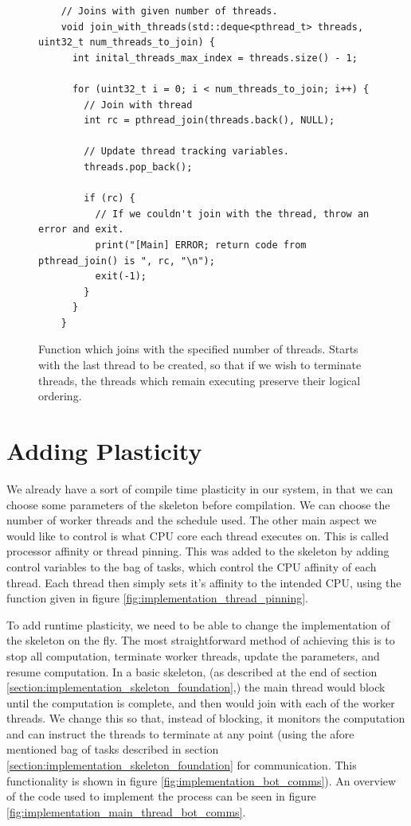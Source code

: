 \begin{figure}
	\begin{lstlisting}
	// Joins with given number of threads. 
	void join_with_threads(std::deque<pthread_t> threads, uint32_t num_threads_to_join) {
	  int inital_threads_max_index = threads.size() - 1;

	  for (uint32_t i = 0; i < num_threads_to_join; i++) {
	    // Join with thread
	    int rc = pthread_join(threads.back(), NULL);

	    // Update thread tracking variables.
	    threads.pop_back();

	    if (rc) {
	      // If we couldn't join with the thread, throw an error and exit.
	      print("[Main] ERROR; return code from pthread_join() is ", rc, "\n");
	      exit(-1);
	    }
	  }
	}
	\end{lstlisting}

	\caption{Function which joins with the specified number of threads. Starts with the last thread to be created, so that if we wish to terminate threads, the threads which remain executing preserve their logical ordering.}
	\label{fig:implementation_join_threads}
\end{figure}



\section{Adding Plasticity}
\label{section:implementation_adding_plasticity}

We already have a sort of compile time plasticity in our system, in that we can choose some parameters of the skeleton before compilation. We can choose the number of worker threads and the schedule used. The other main aspect we would like to control is what CPU core each thread executes on. This is called processor affinity or thread pinning. This was added to the skeleton by adding control variables to the bag of tasks, which control the CPU affinity of each thread. Each thread then simply sets it's affinity to the intended CPU, using the function given in figure \ref{fig:implementation_thread_pinning}.

To add runtime plasticity, we need to be able to change the implementation of the skeleton on the fly. The most straightforward method of achieving this is to stop all computation, terminate worker threads, update the parameters, and resume computation. In a basic skeleton, (as described at the end of section \ref{section:implementation_skeleton_foundation},) the main thread would block until the computation is complete, and then would join with each of the worker threads. We change this so that, instead of blocking, it monitors the computation and can instruct the threads to terminate at any point (using the afore mentioned bag of tasks described in section \ref{section:implementation_skeleton_foundation} for communication. This functionality is shown in figure \ref{fig:implementation_bot_comms}). An overview of the code used to implement the process can be seen in figure \ref{fig:implementation_main_thread_bot_comms}.

